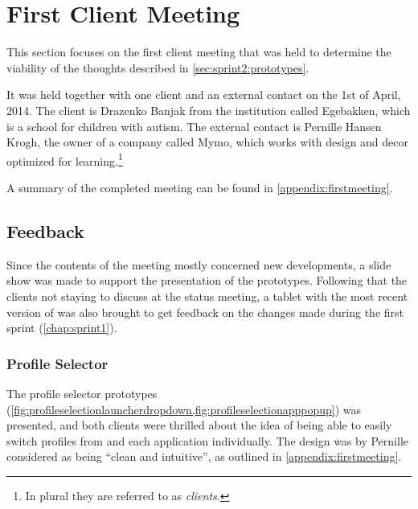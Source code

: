 \section{First Client Meeting}\label{sec:sprint2:firstmeeting}
This section focuses on the first client meeting that was held to determine the viability of the thoughts described in \cref{sec:sprint2:prototypes}.

It was held together with one client and an external contact on the 1st of April, 2014.
The client is Drazenko Banjak from the institution called Egebakken, which is a school for children with autism.
The external contact is Pernille Hansen Krogh, the owner of a company called Mymo, which works with design and decor optimized for learning.\footnote{In plural they are referred to as \textit{clients}.}

A summary of the completed meeting can be found in \cref{appendix:firstmeeting}.

\subsection{Feedback}\label{sec:firstmeeting:feedback}
Since the contents of the meeting mostly concerned new developments, a slide show was made to support the presentation of the prototypes.
Following that the clients not staying to discuss \giraf at the status meeting, a tablet with the most recent version of \launcher was also brought to get feedback on the changes made during the first sprint (\cref{chap:sprint1}).


\subsubsection{Profile Selector}
The profile selector prototypes (\cref{fig:profileselectionlauncherdropdown,fig:profileselectionapppopup}) was presented, and both clients were thrilled about the idea of being able to easily switch profiles from \launcher and each \giraf application individually.
The design was by Pernille considered as being ``clean and intuitive'', as outlined in \cref{appendix:firstmeeting}.


